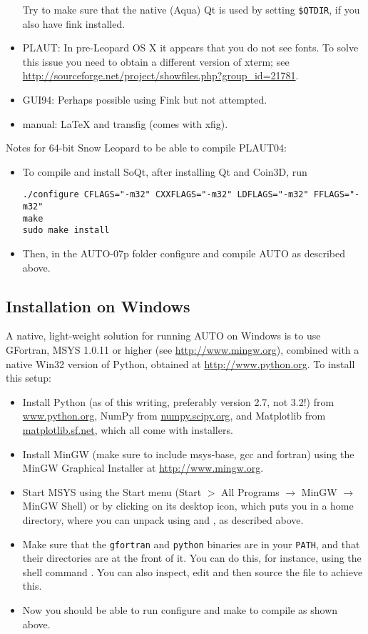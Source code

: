 \documentclass[12pt]{report}
\begin{document}
\begin{itemize}
Try to make sure that the native (Aqua) Qt
is used by setting {\tt \$QTDIR}, if you also have fink installed.
\item {\cal PLAUT}: In pre-Leopard OS X it appears that you do not see
fonts. To solve this issue you need to obtain a different
version of xterm; see
\url{http://sourceforge.net/project/showfiles.php?group_id=21781}.
\item GUI94: Perhaps possible using Fink but not attempted.
\item manual: \LaTeX\xspace and transfig (comes with xfig).
\end{itemize}

Notes for 64-bit Snow Leopard to be able to compile PLAUT04:
\begin{itemize}
\item
To compile and install SoQt, after installing Qt and Coin3D, run
\begin{verbatim}
./configure CFLAGS="-m32" CXXFLAGS="-m32" LDFLAGS="-m32" FFLAGS="-m32"
make
sudo make install
\end{verbatim}
\item
Then, in the AUTO-07p folder configure and compile AUTO as described above.
\end{itemize}

\subsection{Installation on Windows}
A native, light-weight solution for running AUTO on Windows is
to use GFortran, MSYS 1.0.11 or higher (see \url{http://www.mingw.org}),
combined with a native Win32 version of Python,
obtained at \url{http://www.python.org}. To install this setup:
\begin{itemize}
\item
Install Python (as of this writing, preferably version 2.7, not 3.2!)
from \url{www.python.org}, NumPy from \url{numpy.scipy.org},
and Matplotlib from \url{matplotlib.sf.net}, which all come
with installers.
\item
Install MinGW (make sure to include msys-base, gcc and fortran)
using the MinGW Graphical Installer at \url{http://www.mingw.org}.
\item
Start MSYS using the Start menu (Start $>$ All Programs $\to$ MinGW
$\to$ MinGW Shell) or by clicking on its desktop icon, which
puts you in a home directory, where you can unpack
\AUTO using  and , as described above.
\item
Make sure that the {\tt gfortran} and {\tt python} binaries
are in your {\tt PATH}, and that their directories are at the front of it.
You can do this, for instance, using the shell command
.
You can also inspect, edit and then source the file
 to achieve this.
\item
Now you should be able to run configure and make to compile \AUTO
as shown above.
\end{itemize}
\end{document}
